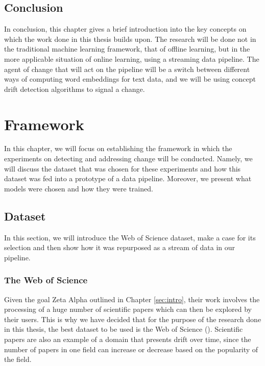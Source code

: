 \documentclass[12pt]{extreport}
\begin{document}
\section{Conclusion}

In conclusion, this chapter gives a brief introduction into the key concepts on which the work done in this thesis builds upon. The research will be done not in the traditional machine learning framework, that of offline learning, but in the more applicable situation of online learning, using a streaming data pipeline. The agent of change that will act on the pipeline will be a switch between different ways of computing word embeddings for text data, and we will be using concept drift detection algorithms to signal a change.

\chapter{Framework} \label{sec:framework}

In this chapter, we will focus on establishing the framework in which the experiments on detecting and addressing change will be conducted. Namely, we will discuss the dataset that was chosen for these experiments and how this dataset was fed into a prototype of a data pipeline. Moreover, we present what models were chosen and how they were trained.

\section{Dataset}

In this section, we will introduce the Web of Science dataset, make a case for its selection and then show how it was repurposed as a stream of data in our pipeline.

\subsection{The Web of Science} \label{wos}

Given the goal Zeta Alpha outlined in Chapter \ref{sec:intro}, their work involves the processing of a huge number of scientific papers which can then be explored by their users. This is why we have decided that for the purpose of the research done in this thesis, the best dataset to be used is the Web of Science (\cite{wos}). Scientific papers are also an example of a domain that presents drift over time, since the number of papers in one field can increase or decrease based on the popularity of the field.
\end{document}
